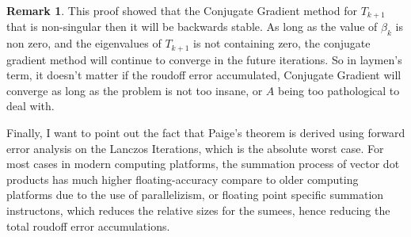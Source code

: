 \documentclass[]{article}
\theoremstyle{definition}
\newtheorem{remark}{Remark}[subsection]
\begin{document}
            \begin{remark}
                This proof showed that the Conjugate Gradient method for $T_{k + 1}$ that is non-singular then it will be backwards stable. As long as the value of $\beta_k$ is non zero, and the eigenvalues of $T_{k + 1}$ is not containing zero, the conjugate gradient method will continue to converge in the future iterations. So in laymen's term, it doesn't matter if the roudoff error accumulated, Conjugate Gradient will converge as long as the problem is not too insane, or $A$ being too pathological to deal with. 
                \par
                Finally, I want to point out the fact that Paige's theorem is derived using forward error analysis on the Lanczos Iterations, which is the absolute worst case. For most cases in modern computing platforms, the summation process of vector dot products has much higher floating-accuracy compare to older computing platforms due to the use of parallelizism, or floating point specific summation instructons, which reduces the relative sizes for the sumees, hence reducing the total roudoff error accumulations. 
            \end{remark}
\end{document}
